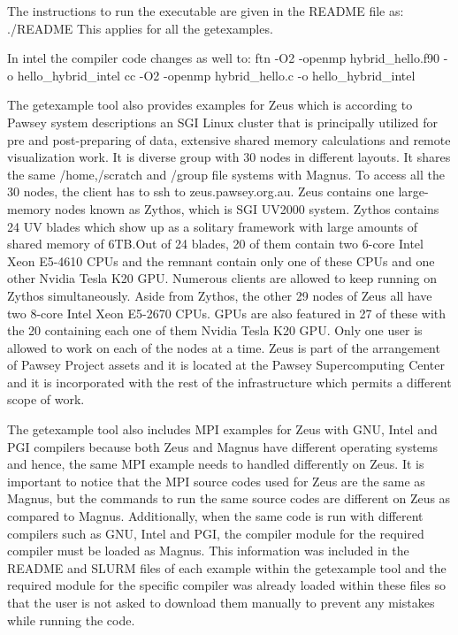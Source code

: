 \begin{Document}
The instructions to run the executable are given in the README  file as:
./README 
This applies for all the getexamples.

In intel the compiler code changes as well to:
ftn -O2 -openmp hybrid_hello.f90 -o hello_hybrid_intel
cc -O2 -openmp hybrid_hello.c -o hello_hybrid_intel



The getexample tool also provides examples for Zeus which is according to Pawsey system descriptions an SGI Linux cluster that is principally utilized 
for pre and post-preparing of data, extensive shared memory calculations and remote visualization work. It is diverse group with 30 nodes in different layouts. It shares the same /home,/scratch and 
/group file systems with Magnus. To access all the 30 nodes, the client has to ssh to zeus.pawsey.org.au.
Zeus contains one large-memory nodes known as Zythos, which is SGI UV2000 system. Zythos contains 24 UV blades which show up as a solitary framework 
with large amounts of shared memory of 6TB.Out of 24 blades, 20 of them contain two 6-core Intel Xeon E5-4610 CPUs and the remnant contain only one of 
these CPUs and one other Nvidia Tesla K20 GPU. Numerous clients are allowed to keep running on Zythos simultaneously. Aside from Zythos, the other 29 
nodes of Zeus all have two 8-core Intel Xeon E5-2670 CPUs. GPUs are also featured in 27 of these with the 20 containing each one of them Nvidia Tesla 
K20 GPU. Only one user is allowed to work on each of the nodes at a time. Zeus is part of the arrangement of Pawsey Project assets and it is located at 
the Pawsey Supercomputing Center and it is incorporated with the rest of the infrastructure which permits a different scope of work.
 



The getexample tool also includes MPI examples for Zeus with GNU, Intel and PGI compilers because both Zeus and Magnus have different operating systems 
and hence, the same MPI example needs to handled differently on Zeus. It is important to notice that the MPI source codes used for Zeus are the same
as Magnus, but the commands to run the same source codes are different on Zeus as compared to Magnus. Additionally, when the same code is run 
with different compilers such as GNU, Intel and PGI, the compiler module for the required compiler must be loaded as Magnus. This information was
included in the README and SLURM files of each example within the getexample tool and the required module for the specific compiler was already loaded 
within these files so that the user is not asked to download them manually to prevent any mistakes while running the code.


\end{Document}
